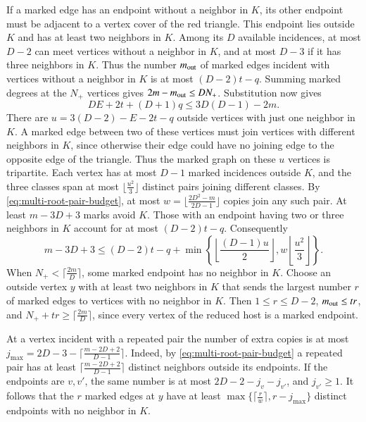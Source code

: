 \documentclass[preprint,11pt,numbers]{elsarticle-arxiv}
\numberwithin{equation}{section}
\theoremstyle{definition}
\begin{document}
If a marked edge has an endpoint without a neighbor in $K$, its
other endpoint must be adjacent to a vertex cover of the red
triangle. This endpoint lies outside $K$ and has at least two
neighbors in $K$. Among its $D$ available incidences, at most
$D-2$ can meet vertices without a neighbor in $K$, and at most
$D-3$ if it has three neighbors in $K$. Thus the number
$m_{\rm out}$ of marked edges incident with vertices without a
neighbor in $K$ is at most $(D-2)t-q$. Summing marked degrees at
the $N_+$ vertices gives $2m-m_{\rm out}\leq DN_+$. Substitution
now gives
\[
 DE+2t+(D+1)q\le 3D(D-1)-2m.
\]
There are $u=3(D-2)-E-2t-q$ outside vertices with just one neighbor
in $K$. A marked edge between two of these vertices must join vertices
with different neighbors in $K$, since otherwise their edge could
have no joining edge to the opposite edge of the triangle. Thus the
marked graph on these $u$ vertices is tripartite. Each vertex has at
most $D-1$ marked incidences outside $K$, and the three classes span
at most $\lfloor\frac{u^2}{3}\rfloor$ distinct pairs joining different classes.
By \eqref{eq:multi-root-pair-budget}, at most
$w=\lfloor\frac{2D^2-m}{2D-1}\rfloor$ copies join any such pair.
At least $m-3D+3$ marks avoid $K$. Those with an endpoint having two
or three neighbors in $K$ account for at most $(D-2)t-q$. Consequently
\[
 m-3D+3\le (D-2)t-q+
 \min\left\{\left\lfloor\frac{(D-1)u}{2}\right\rfloor,
                  w\left\lfloor\frac{u^2}{3}\right\rfloor\right\}.
\]
When $N_+<\lceil\frac{2m}{D}\rceil$, some marked endpoint has no neighbor
in $K$. Choose an outside vertex $y$ with at least two neighbors in $K$
that sends the largest number $r$ of marked edges to vertices with no
neighbor in $K$. Then $1\le r\le D-2$, $m_{\rm out}\le tr$, and
$N_++tr\ge\lceil\frac{2m}{D}\rceil$, since every vertex of the reduced
host is a marked endpoint.

At a vertex incident with a repeated pair the number of extra copies
is at most
$j_{\max}=2D-3-\lceil\frac{m-2D+2}{D-1}\rceil$. Indeed, by
\eqref{eq:multi-root-pair-budget} a repeated pair has at least
$\lceil\frac{m-2D+2}{D-1}\rceil$ distinct neighbors outside its
endpoints. If the endpoints are $v,v'$, the same number is at most
$2D-2-j_v-j_{v'}$, and $j_{v'}\ge1$. It follows that the $r$
marked edges at $y$ have at least
$\max\{\lceil\frac{r}{w}\rceil,r-j_{\max}\}$ distinct endpoints
with no neighbor in $K$.
\end{document}
